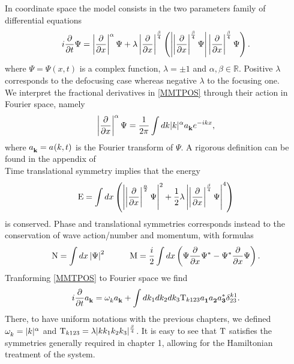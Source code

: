     In coordinate space the model consists in the two parameters family of differential equations
    \begin{equation}
        i\frac{\partial}{\partial t} \Psi = \left|\frac{\partial}{\partial x}\right|^\alpha \Psi + \lambda \left|\frac{\partial}{\partial x}\right|^{\frac{\beta}{4}}
        \left( \left|\left|\frac{\partial}{\partial x}\right|^{\frac{\beta}{4}}\Psi\right|\left|\frac{\partial}{\partial x}\right|^{\frac{\beta}{4}}\Psi \right).
        \label{MMTPOS}
    \end{equation}
    where $\Psi = \Psi(x,t)$ is a complex function, $\lambda = \pm 1$ and $\alpha, \beta \in \mathbb{R}$. Positive $\lambda$ 
    corresponds to the defocusing case whereas negative $\lambda$ to the focusing one.\\
    We interpret the fractional derivatives in \eqref{MMTPOS} through their action in Fourier space, namely 
    \begin{equation}
        \left|\frac{\partial}{\partial x}\right|^\alpha \Psi = \frac{1}{2\pi} \int dk |k|^{\alpha} a_\mathbf{k}^{} e^{-ikx},
    \end{equation} 
    where $a_\mathbf{k}^{} = a^{}(k,t)$ is the Fourier transform of $\Psi$. A rigorous definition can be found in the appendix of \cite{ZAKHAROV2004}\\
    Time translational symmetry implies that the energy
    \begin{equation}
        \mathrm{E} = \int dx \left( \left|\left|\frac{\partial}{\partial x}\right|^\frac{\alpha}{2}\Psi\right|^2 + \frac{1}{2}\lambda\left|\left|\frac{\partial}{\partial x}\right|^\frac{\beta}{4}\Psi\right|^4 \right)
    \end{equation}
    is conserved. Phase and translational symmetries corresponds instead to the conservation of wave action/number and momentum, with formulas
    \begin{equation}
        \mathrm{N} = \int dx \left| \Psi \right|^2 \hspace{1cm} \textrm{M} = \frac{i}{2}\int dx \left( \Psi \frac{\partial}{\partial x} \Psi^* - \Psi^* \frac{\partial}{\partial x} \Psi \right).
    \end{equation}
    Tranforming \eqref{MMTPOS} to Fourier space we find
    \begin{equation}
        i\frac{\partial}{\partial t} a_\mathbf{k}^{} = \omega^{}_k a_\mathbf{k}^{}  + \int dk_1dk_2dk_3 \mathrm{T}_{k123}a_\mathbf{1}^{} a_\mathbf{2}^{} a_\mathbf{3}^{*} \delta^{k1}_{23}.
    \end{equation}
    There, to have uniform notations with the previous chapters, we defined $\omega^{}_k = |k|^\alpha$ and $\mathrm{T}_{k123} = \lambda|kk_1k_2k_3|^\frac{\beta}{4}$. It is easy to see that
    $\mathrm{T}$ satisfies the symmetries generally required in chapter 1, allowing for the Hamiltonian treatment of the system. \\
